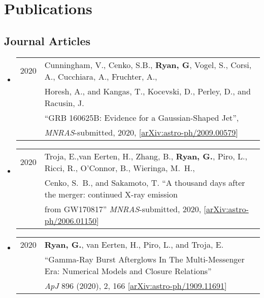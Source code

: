 \section*{Publications}
\subsection*{Journal Articles}
\begin{itemize}

\item \begin{tabular}{ll}
2020 & {Cunningham}, V., {Cenko}, S.B., {\bf {Ryan}, G}, {Vogel}, S., {Corsi}, A., {Cucchiara}, A., {Fruchter}, A.,\\
	& {Horesh}, A., and {Kangas}, T., {Kocevski}, D., {Perley}, D., and {Racusin}, J. \\
	& ``GRB 160625B: Evidence for a Gaussian-Shaped Jet'',\\
	& \emph{MNRAS}-submitted, 2020, [\href{https://arxiv.org/abs/2009.00579}{arXiv:astro-ph/2009.00579}]
\end{tabular}

\item \begin{tabular}{ll}
2020 & {Troja}, E.,{van Eerten}, H., {Zhang}, B., {\bf {Ryan}, G.}, {Piro}, L., {Ricci}, R., {O'Connor}, B., {Wieringa}, M.~H.,\\
	&  {Cenko}, S.~B., and {Sakamoto}, T.  ``A thousand days after the merger: continued X-ray emission\\
	&  from GW170817''  \emph{MNRAS}-submitted, 2020, [\href{https://arxiv.org/abs/2006.01150}{arXiv:astro-ph/2006.01150}]
\end{tabular}

\item \begin{tabular}{ll}
2020 & {\bf {Ryan}, G.}, {van Eerten}, H., {Piro}, L., and {Troja}, E. \\
	& ``Gamma-Ray Burst Afterglows In The Multi-Messenger Era: Numerical Models and Closure Relations'' \\
	& \emph{ApJ} 896 (2020), 2, 166 [\href{https://arxiv.org/abs/1909.11691}{arXiv:astro-ph/1909.11691}]
\end{tabular}


\end{itemize}

